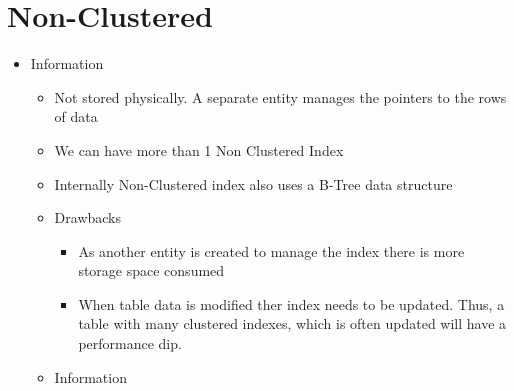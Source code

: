 \section*{Non-Clustered} %
    \begin{itemize}
    \item Information
        \begin{itemize}
        \item Not stored physically. A separate entity manages the pointers to the rows of data
        \item We can have more than 1 Non Clustered Index
        \item Internally Non-Clustered index also uses a B-Tree data structure
        \end{itemize}
        
    \begin{itemize}
    \item Drawbacks
            \begin{itemize}
            \item As another entity is created to manage the index there is more storage space consumed
            \item When table data is modified ther index needs to be updated. Thus, a table with many clustered indexes, which is often updated will have a performance dip.
            \end{itemize}
    \item Information
    \end{itemize}
\end{itemize}
